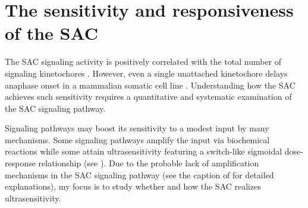 \section{The sensitivity and responsiveness of the SAC}
\label{Sensitivity+Responsiveness}

The SAC signaling activity is positively correlated with the total number of signaling kinetochores \cite{RiederNormalProgression, Rheostat, Ablation}. However, even a single unattached kinetochore delays anaphase onset in a mammalian somatic cell line \cite{PtK1SingleUnattachedKT}. Understanding how the SAC achieves such sensitivity requires a quantitative and systematic examination of the SAC signaling pathway.

Signaling pathways may boost its sensitivity to a modest input by many mechanisms. Some signaling pathways amplify the input via biochemical reactions while some attain ultrasensitivity featuring a switch-like sigmoidal dose-response relationship (see ). Due to the probable lack of amplification mechanisms in the SAC signaling pathway (see the caption of  for detailed explanations), my focus is to study whether and how the SAC realizes ultrasensitivity.


